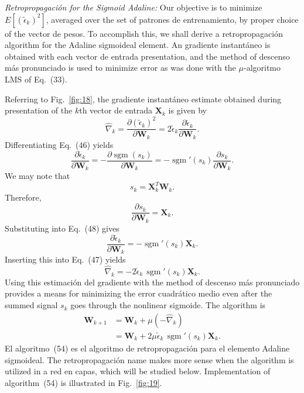 \documentclass[10pt,twocolumn]{article}
\newcommand{\X}{\bm{X}}
\newcommand{\W}{\bm{W}}
\newcommand{\sgm}{\operatorname{sgm}}
\begin{document}
\textit{Retropropagación for the Sigmoid Adaline:} Our objective is to minimize
$E[(\tilde{\epsilon}_k)^2]$, averaged over the set of patrones de entrenamiento, by proper
choice of the vector de pesos. To accomplish this, we shall derive a retropropagación
algorithm for the Adaline sigmoideal element. An gradiente instantáneo is obtained
with each vector de entrada presentation, and the method of descenso más pronunciado is used to
minimize error as was done with the $\mu$-algoritmo LMS of Eq.~(33).

Referring to Fig.~\ref{fig:18}, the gradiente instantáneo estimate obtained during
presentation of the $k$th vector de entrada $\X_k$ is given by
\begin{equation}
\hat{\nabla}_k = \frac{\partial(\tilde{\epsilon}_k)^2}{\partial\W_k}
= 2\tilde{\epsilon}_k\frac{\partial\tilde{\epsilon}_k}{\partial\W_k}. \tag{47}
\end{equation}
Differentiating Eq.~(46) yields
\begin{equation}
\frac{\partial\tilde{\epsilon}_k}{\partial\W_k} = -\frac{\partial\sgm(s_k)}{\partial\W_k}
= -\sgm'(s_k)\frac{\partial s_k}{\partial\W_k}. \tag{48}
\end{equation}
We may note that
\begin{equation}
s_k = \X_k^{T}\W_k. \tag{49}
\end{equation}
Therefore,
\begin{equation}
\frac{\partial s_k}{\partial\W_k} = \X_k. \tag{50}
\end{equation}
Substituting into Eq.~(48) gives
\begin{equation}
\frac{\partial\tilde{\epsilon}_k}{\partial\W_k} = -\sgm'(s_k)\X_k. \tag{51}
\end{equation}
Inserting this into Eq.~(47) yields
\begin{equation}
\hat{\nabla}_k = -2\tilde{\epsilon}_k\,\sgm'(s_k)\X_k. \tag{52}
\end{equation}
Using this estimación del gradiente with the method of descenso más pronunciado provides a means
for minimizing the error cuadrático medio even after the summed signal $s_k$ goes
through the nonlinear sigmoide. The algorithm is
\begin{align}
\W_{k+1} &= \W_k + \mu(-\hat{\nabla}_k) \tag{53}\\
&= \W_k + 2\mu\tilde{\epsilon}_k\,\sgm'(s_k)\X_k. \tag{54}
\end{align}
El algoritmo~(54) es el algoritmo de retropropagación para el elemento Adaline sigmoideal.
The retropropagación name makes more sense when the algorithm is utilized in a
red en capas, which will be studied below. Implementation of algorithm~(54) is
illustrated in Fig.~\ref{fig:19}.
\end{document}
